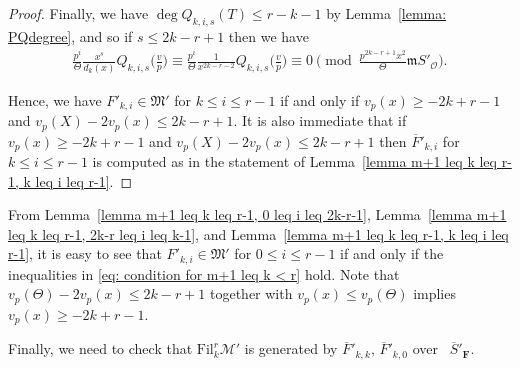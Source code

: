 \documentclass[11pt]{amsart}
\theoremstyle{definition}
\numberwithin{equation}{subsection}
\theoremstyle{plain}
\theoremstyle{plain}
\theoremstyle{plain}
\theoremstyle{plain}
\theoremstyle{plain}
\theoremstyle{plain}
\theoremstyle{plain}
\theoremstyle{plain}
\theoremstyle{plain}
\theoremstyle{plain}
\theoremstyle{plain}
\theoremstyle{plain}
\theoremstyle{definition}
\theoremstyle{definition}
\theoremstyle{definition}
\theoremstyle{remark}
\renewcommand{\(}{\textup{(}}
\renewcommand{\)}{\textup{)}}
\newcommand{\F}{\mathbf{F}}
\newcommand{\barS}{\overline{S}}
\newcommand{\cM}{\mathcal{M}}
\newcommand{\fM}{\mathfrak{M}}
\newcommand{\fm}{\mathfrak{m}}
\newcommand{\Fil}{\mathrm{Fil}}
\newcommand{\cO}{\mathcal{O}}
\newcommand{\barF}{\overline{F}}
\begin{document}
\begin{proof}
Finally, we have $\deg Q_{k,i,s}(T)\leq r-k-1$ by Lemma~\ref{lemma: PQdegree}, and so if $s\leq 2k-r+1$ then we have
\begin{align*}
    \frac{p^i}{\Theta}\frac{x^s}{d_k(x)}Q_{k,i,s}\Big(\frac{v}{p}\Big)\equiv \frac{p^{i}}{\Theta}\frac{1}{x^{2k-r-2}}Q_{k,i,s}\Big(\frac{v}{p}\Big) \equiv
    0 \pmod{\frac{p^{2k-r+1}x^2}{\Theta}\fm S'_\cO}.
\end{align*}





Hence, we have $F'_{k,i}\in\fM'$ for $k\leq i\leq r-1$ if and only if $v_p(x)\geq -2k+r-1$ and $v_p(X)-2v_p(x)\leq 2k-r+1$. It is also immediate that if $v_p(x)\geq -2k+r-1$ and $v_p(X)-2v_p(x)\leq 2k-r+1$ then $\barF'_{k,i}$ for $k\leq i\leq r-1$ is computed as in the statement of Lemma~\ref{lemma m+1 leq k leq r-1, k leq i leq r-1}.
\end{proof}













From Lemma~\ref{lemma m+1 leq k leq r-1, 0 leq i leq 2k-r-1}, Lemma~\ref{lemma m+1 leq k leq r-1, 2k-r leq i leq k-1}, and Lemma~\ref{lemma m+1 leq k leq r-1, k leq i leq r-1}, it is easy to see that $F'_{k,i}\in\fM'$ for $0\leq i\leq r-1$ if and only if the inequalities in \eqref{eq: condition for m+1 leq k < r} hold. Note that $v_p(\Theta)-2v_p(x)\leq 2k-r+1$ together with $v_p(x)\leq v_p(\Theta)$ implies $ v_p(x)\geq -2k+r-1$.

Finally, we need to check that $\Fil^r_{k}\cM'$ is generated by $\barF'_{k,k},\,\barF'_{k,0}$ over~ $\barS'_\F$.
\end{document}
